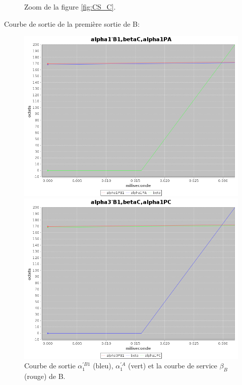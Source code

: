 \begin{figure}[!ht]
\begin{minipage}{.48\textwidth}
\caption{\label{fig:CS_C-2}Zoom de la figure \ref{fig:CS_C}.}%
\end{minipage}%
\end{figure} 


Courbe de sortie de la première sortie de B: 
\begin{figure}[!ht]%
\begin{minipage}{.48\textwidth}%
\centering%
\noindent\includegraphics[width = \textwidth]{./II/images/alpha1PB1.png}%
\caption{\label{fig:alpha1PB1}Courbe de sortie $\alpha_{1}^{'B1}$ (bleu), $\alpha_{1} ^{'A}$ (vert) et la courbe de service $\beta_B$ (rouge) de B.}%
\end{minipage}\hfill%
\begin{minipage}{.48\textwidth}%
\centering%
\noindent\includegraphics[width = \textwidth]{./II/images/alpha3PB1.png}%

\end{minipage}
\end{figure}
